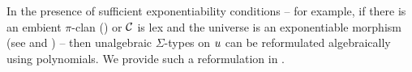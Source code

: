 In the presence of sufficient exponentiability conditions --
for example, if there is an embient $\pi$-clan () or
$\mathcal{C}$ is lex and the universe is an exponentiable morphism
(see  and ) --
then unalgebraic $\Sigma$-types on ${u}$
can be reformulated algebraically using polynomials.
We provide such a reformulation in .


